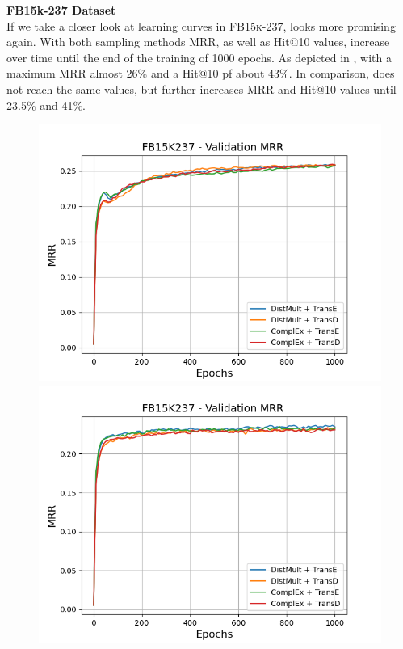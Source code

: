 \textbf{FB15k-237 Dataset}
\label{subsubsec:uncertainty_fb15k237}\\
%
If we take a closer look at learning curves in \textsc{FB15k-237}, \ussoftmax looks more promising again.
With both sampling methods MRR, as well as Hit@10 values, increase over time until the end of the training of 1000 epochs.
As depicted in , with \origsampling a maximum MRR almost 26\% and a Hit@10 pf about 43\%.
In comparison, \ussoftmax does not reach the same values, but further increases MRR and Hit@10 values until 23.5\% and 41\%.
\begin{figure}[H]
    \centering
    \begin{minipage}{.5\textwidth}
      \centering
      \includegraphics[width=0.9\linewidth]{figures/results/gan_train/not_pretrained/random/fb15k237/epochs1000/random_fb15k237_mrrs.png}
    \end{minipage}%
    \begin{minipage}{.5\textwidth}
      \centering
      \includegraphics[width=0.9\linewidth]{figures/results/gan_train/not_pretrained/uncertainty/max_distribution/entropy/fb15k237/1k_epochs/uncertainty_fb15k237_mrrs.png}

\end{minipage}
\end{figure}
